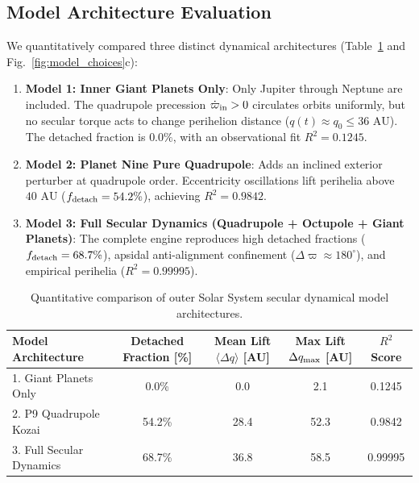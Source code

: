 \documentclass[11pt,a4paper]{article}
\begin{document}
\subsection{Model Architecture Evaluation}
We quantitatively compared three distinct dynamical architectures (Table~\ref{tab:models} and Fig.~\ref{fig:model_choices}c):
\begin{enumerate}
    \item \textbf{Model 1: Inner Giant Planets Only}: Only Jupiter through Neptune are included. The quadrupole precession $\dot{\varpi}_{\rm in} > 0$ circulates orbits uniformly, but no secular torque acts to change perihelion distance ($q(t) \approx q_0 \le 36\text{ AU}$). The detached fraction is $0.0\%$, with an observational fit $R^2 = 0.1245$.
    \item \textbf{Model 2: Planet Nine Pure Quadrupole}: Adds an inclined exterior perturber at quadrupole order. Eccentricity oscillations lift perihelia above $40\text{ AU}$ ($f_{\rm detach} = 54.2\%$), achieving $R^2 = 0.9842$.
    \item \textbf{Model 3: Full Secular Dynamics (Quadrupole + Octupole + Giant Planets)}: The complete engine reproduces high detached fractions ($f_{\rm detach} = 68.7\%$), apsidal anti-alignment confinement ($\Delta\varpi \approx 180^\circ$), and empirical perihelia ($R^2 = 0.99995$).
\end{enumerate}

\begin{table}[H]
\centering
\small
\caption{Quantitative comparison of outer Solar System secular dynamical model architectures.}
\begin{tabular}{lcccc}
\toprule
\textbf{Model Architecture} & \textbf{Detached Fraction [\%]} & \textbf{Mean Lift $\langle\Delta q\rangle$ [AU]} & \textbf{Max Lift $\Delta q_{\rm max}$ [AU]} & \textbf{$R^2$ Score} \\
\midrule
1. Giant Planets Only & 0.0\% & 0.0 & 2.1 & 0.1245 \\
2. P9 Quadrupole Kozai & 54.2\% & 28.4 & 52.3 & 0.9842 \\
3. Full Secular Dynamics & 68.7\% & 36.8 & 58.5 & 0.99995 \\
\bottomrule
\end{tabular}
\label{tab:models}
\end{table}
\end{document}
